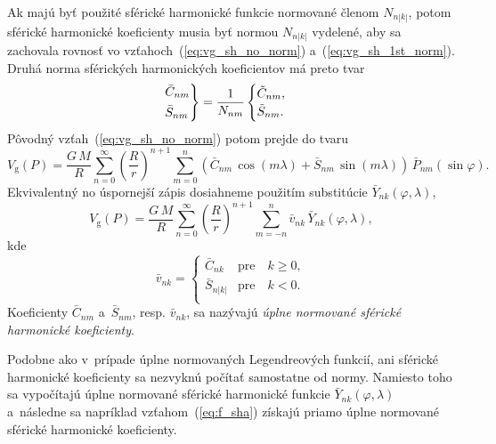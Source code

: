 \documentclass[a4paper, 12pt]{book}
\newcommand{\gidx}{\mathrm g}
\begin{document}
Ak majú byť použité sférické harmonické funkcie normované členom $N_{n|k|}$, 
potom sférické harmonické koeficienty musia byť normou $N_{n|k|}$ vydelené, aby 
sa zachovala rovnosť vo vzťahoch~(\ref{eq:vg_sh_no_norm}) 
a~(\ref{eq:vg_sh_1st_norm}).  Druhá norma sférických harmonických koeficientov 
má preto tvar
%
\begin{equation}
\begin{rcases}
\bar{C}_{nm}\\
\bar{S}_{nm}
\end{rcases}
= \frac{1}{N_{nm}}
\begin{cases}
\tilde{C}_{nm}{,}\\
\tilde{S}_{nm}{.}
\end{cases}
\end{equation}
%
Pôvodný vzťah~(\ref{eq:vg_sh_no_norm}) potom prejde do tvaru
%
\begin{equation}
\label{eq:vg_sh_2nd_norm}
V_\gidx(P) = \frac{G \, M}{R} \sum_{n = 0}^\infty \left( \frac{R}{r} \right)^{n 
+ 1} \sum_{m = 0}^{n} \left( \bar{C}_{nm} \, \cos(m\lambda) + \bar{S}_{nm} \, 
\sin(m\lambda)\right) \, \bar{P}_{nm}(\sin\varphi){.}
\end{equation}
%
Ekvivalentný no úspornejší zápis dosiahneme použitím substitúcie 
$\bar{Y}_{nk}(\varphi, \lambda)$,
%
\begin{equation}
\label{eq:vg_sh_2nd_norm_ynk}
V_\gidx(P) = \frac{G \, M}{R} \sum_{n = 0}^\infty \left( \frac{R}{r} \right)^{n 
+ 1} \sum_{m = -n}^{n} \bar{v}_{nk} \, \bar{Y}_{nk}(\varphi, \lambda){,}
\end{equation}
kde
%
\begin{equation}
\bar{v}_{nk} =
%
\begin{cases}
\bar{C}_{nk}  &\text{pre} \quad k \geq 0{,}\\
\bar{S}_{n|k|}  &\text{pre} \quad k < 0{.}\\
\end{cases}
\end{equation}
%
Koeficienty $\bar{C}_{nm}$ a~$\bar{S}_{nm}$, resp. $\bar{v}_{nk}$, sa nazývajú 
\emph{úplne normované sférické harmonické koeficienty}.

Podobne ako v~prípade úplne normovaných Legendreových funkcií, ani sférické 
harmonické koeficienty sa nezvyknú počítať samostatne od normy.  Namiesto toho 
sa vypočítajú úplne normované sférické harmonické funkcie 
$\bar{Y}_{nk}(\varphi, \lambda)$ a~následne sa napríklad 
vzťahom~(\ref{eq:f_sha}) získajú priamo úplne normované sférické harmonické 
koeficienty.
\end{document}
